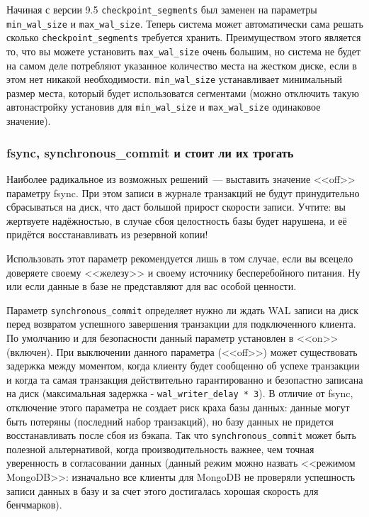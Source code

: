 Начиная с версии 9.5 \lstinline!checkpoint_segments! был заменен на параметры \lstinline!min_wal_size! и \lstinline!max_wal_size!. Теперь система может автоматически сама решать сколько \lstinline!checkpoint_segments! требуется хранить. Преимуществом этого является то, что вы можете установить \lstinline!max_wal_size! очень большим, но система не будет на самом деле потребляют указанное количество места на жестком диске, если в этом нет никакой необходимости. \lstinline!min_wal_size! устанавливает минимальный размер места, который будет использоватся сегментами (можно отключить такую автонастройку установив для \lstinline!min_wal_size! и \lstinline!max_wal_size! одинаковое значение).


\subsubsection{fsync, synchronous\_commit и стоит ли их трогать}


Наиболее радикальное из возможных решений~--- выставить значение <<off>> параметру fsync. При этом записи в журнале транзакций не будут принудительно сбрасываться на диск, что даст большой прирост скорости записи. Учтите: вы жертвуете надёжностью, в случае сбоя целостность базы будет нарушена, и её придётся восстанавливать из резервной копии!

Использовать этот параметр рекомендуется лишь в том случае, если вы всецело доверяете своему <<железу>> и своему источнику бесперебойного питания. Ну или если данные в базе не представляют для вас особой ценности.

Параметр \lstinline!synchronous_commit! определяет нужно ли ждать WAL записи на диск перед возвратом успешного завершения транзакции для подключенного клиента. По умолчанию и для безопасности данный параметр установлен в <<on>> (включен). При выключении данного параметра (<<off>>) может существовать задержка между моментом, когда клиенту будет сообщенно об успехе транзакции и когда та самая транзакция действительно гарантированно и безопастно записана на диск (максимальная задержка - \lstinline!wal_writer_delay * 3!). В отличие от fsync, отключение этого параметра не создает риск краха базы данных: данные могут быть потеряны (последний набор транзакций), но базу данных не придется восстанавливать после сбоя из бэкапа. Так что \lstinline!synchronous_commit! может быть полезной альтернативой, когда производительность важнее, чем точная уверенность в согласовании данных (данный режим можно назвать <<режимом MongoDB>>: изначально все клиенты для MongoDB не проверяли успешность записи данных в базу и за счет этого достигалась хорошая скорость для бенчмарков).



